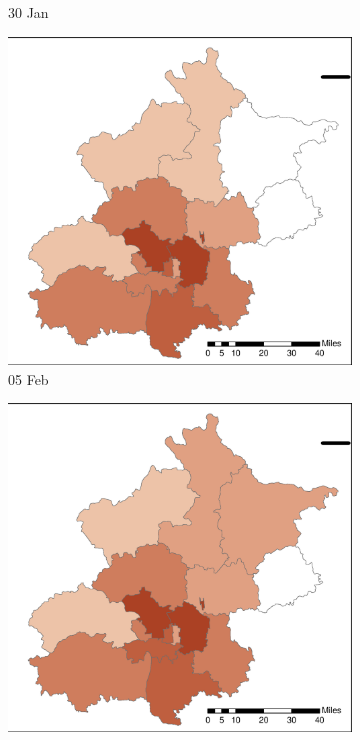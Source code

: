 \documentclass[preprints,ijgi,submit,moreauthors]{Definitions/mdpi}
\begin{document}
\begin{figure}[H]
\begin{subfigure}{.23\textwidth}
        \caption{30 Jan}
    \end{subfigure}
    \begin{subfigure}{.23\textwidth}
        \includegraphics[width=\textwidth]{Figures/ConfirmedDistrictD2020_02_05.eps}
        \caption{05 Feb}
    \end{subfigure}
    \begin{subfigure}{.23\textwidth}
        \includegraphics[width=\textwidth]{Figures/ConfirmedDistrictD2020_02_10.eps}

\end{subfigure}
\end{figure}
\end{document}
